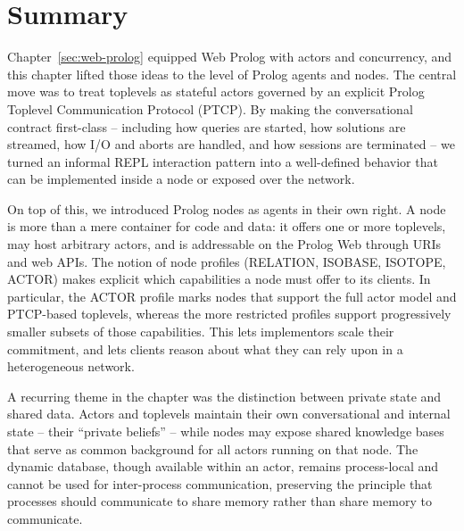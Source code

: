 %

\section{Summary}

Chapter~\ref{sec:web-prolog} equipped Web Prolog with actors and concurrency, and this chapter lifted those ideas to the level of Prolog agents and nodes. The central move was to treat toplevels as stateful actors governed by an explicit Prolog Toplevel Communication Protocol (PTCP). By making the conversational contract first-class -- including how queries are started, how solutions are streamed, how I/O and aborts are handled, and how sessions are terminated -- we turned an informal REPL interaction pattern into a well-defined behavior that can be implemented inside a node or exposed over the network.

On top of this, we introduced Prolog nodes as agents in their own right. A node is more than a mere container for code and data: it offers one or more toplevels, may host arbitrary actors, and is addressable on the Prolog Web through URIs and web APIs. The notion of node profiles (RELATION, ISOBASE, ISOTOPE, ACTOR) makes explicit which capabilities a node must offer to its clients. In particular, the ACTOR profile marks nodes that support the full actor model and PTCP-based toplevels, whereas the more restricted profiles support progressively smaller subsets of those capabilities. This lets implementors scale their commitment, and lets clients reason about what they can rely upon in a heterogeneous network.

A recurring theme in the chapter was the distinction between private state and shared data. Actors and toplevels maintain their own conversational and internal state -- their ``private beliefs'' -- while nodes may expose shared knowledge bases that serve as common background for all actors running on that node. The dynamic database, though available within an actor, remains process-local and cannot be used for inter-process communication, preserving the principle that processes should communicate to share memory rather than share memory to communicate.

